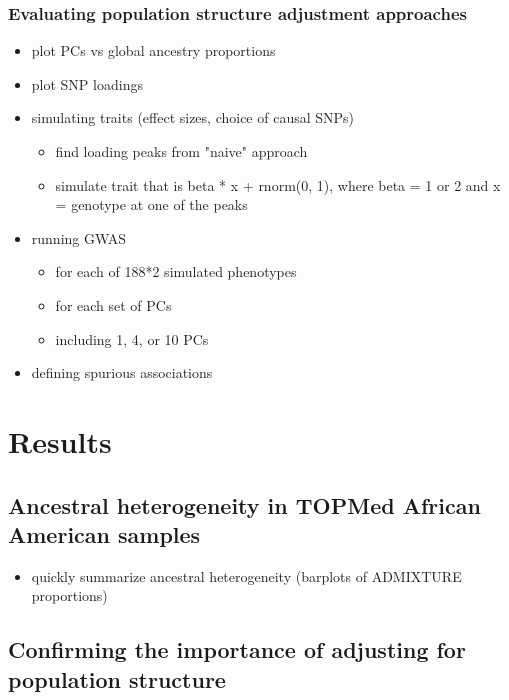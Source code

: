 \documentclass[12pt]{article}
\begin{document}
\subsubsection{Evaluating population structure adjustment approaches}

\begin{itemize}
\item plot PCs vs global ancestry proportions
\item plot SNP loadings 
\end{itemize}


\begin{itemize}
\item simulating traits (effect sizes, choice of causal SNPs)
	\begin{itemize}
	\item find loading peaks from "naive" approach
	\item simulate trait that is beta * x + rnorm(0, 1), where beta = 1 or 2 and x = genotype at one of the peaks
	\end{itemize}
\item running GWAS
	\begin{itemize}
	\item for each of 188*2 simulated phenotypes
	\item for each set of PCs
	\item including 1, 4, or 10 PCs
	\end{itemize}
\item defining spurious associations
\end{itemize}



\section{Results}

\subsection{Ancestral heterogeneity in TOPMed African American samples}

\begin{itemize}
\item quickly summarize ancestral heterogeneity (barplots of ADMIXTURE proportions)
\end{itemize}


\subsection{Confirming the importance of adjusting for population structure}
\end{document}
